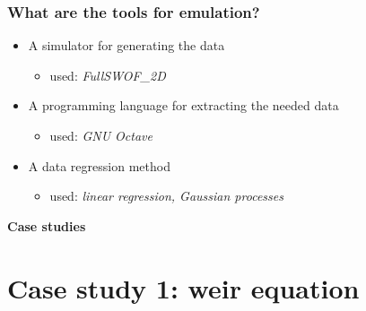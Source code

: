 \documentclass[xcolor=dvipsnames, USenglish]{beamer}  %
\begin{document}
  \begin{frame}
    \frametitle{What are the tools for emulation?}
    \begin{itemize}
    \setlength{\itemsep}{10pt}%
      \item A simulator for generating the data
      \begin{itemize}
        \item used: \textit{FullSWOF\_2D}
      \end{itemize}
      \item A programming language for extracting the needed data
      \begin{itemize}
        \item used: \textit{GNU Octave}
      \end{itemize}
      \item A data regression method
      \begin{itemize}
        \item used: \textit{linear regression, Gaussian processes}
      \end{itemize}
    \end{itemize}
  \end{frame}


  {
  \begin{frame}[plain]
    \centering
    \Large{\textbf{Case studies}}\\
  \end{frame}
  }


\section{Case study 1: weir equation}
\end{document}

